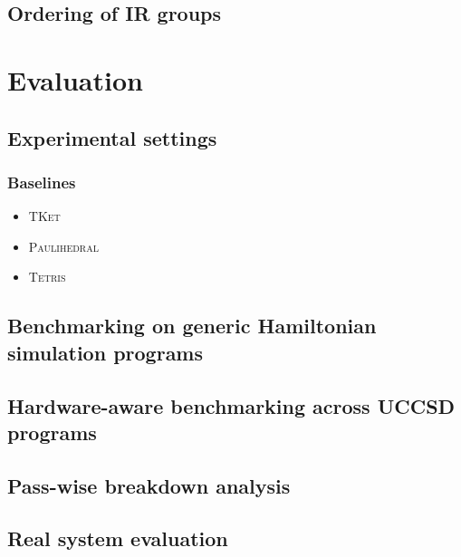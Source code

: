 \documentclass[conference]{IEEEtran}
\newcommand{\tket}{\textsc{TKet}}
\newcommand{\tetris}{\textsc{Tetris}}
\newcommand{\paulihedral}{\textsc{Paulihedral}}
\begin{document}
\subsection{Ordering of IR groups}



\section{Evaluation}


\subsection{Experimental settings}

\subsubsection{Baselines}

\begin{itemize}
    \item \tket
    \item \paulihedral
    \item \tetris
\end{itemize}



\subsection{Benchmarking on generic Hamiltonian simulation programs}



\subsection{Hardware-aware benchmarking across UCCSD programs}



\subsection{Pass-wise breakdown analysis}





\subsection{Real system evaluation}
\end{document}
